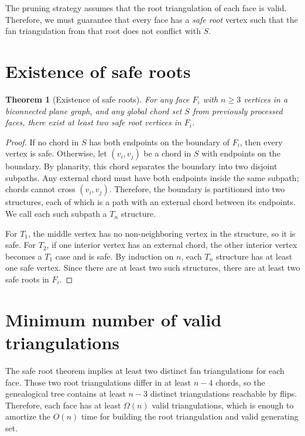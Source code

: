 \documentclass[12pt,a4paper]{report}
\newtheorem{theorem}{Theorem}[chapter]
\theoremstyle{definition}
\theoremstyle{remark}
\newcommand{\ChordSet}{S}
\begin{document}
The pruning strategy assumes that the root triangulation of each face is valid. Therefore,
we must guarantee that every face has a \textit{safe root} vertex such that the fan
triangulation from that root does not conflict with $\ChordSet$.

\section{Existence of safe roots}

\begin{theorem}[Existence of safe roots]
\label{thm:safe_root}
For any face $F_i$ with $n \ge 3$ vertices in a biconnected plane graph, and any global
chord set $\ChordSet$ from previously processed faces, there exist at least two safe root
vertices in $F_i$.
\end{theorem}

\begin{proof}
If no chord in $\ChordSet$ has both endpoints on the boundary of $F_i$, then every vertex
is safe. Otherwise, let $(v_i,v_j)$ be a chord in $\ChordSet$ with endpoints on the
boundary. By planarity, this chord separates the boundary into two disjoint subpaths.
Any external chord must have both endpoints inside the same subpath; chords cannot cross
$(v_i,v_j)$. Therefore, the boundary is partitioned into two structures, each of which is
a path with an external chord between its endpoints. We call each such subpath a $T_n$
structure.

For $T_1$, the middle vertex has no non-neighboring vertex in the structure, so it is
safe. For $T_2$, if one interior vertex has an external chord, the other interior vertex
becomes a $T_1$ case and is safe. By induction on $n$, each $T_n$ structure has at least
one safe vertex. Since there are at least two such structures, there are at least two safe
roots in $F_i$.
\end{proof}

\section{Minimum number of valid triangulations}

The safe root theorem implies at least two distinct fan triangulations for each face.
Those two root triangulations differ in at least $n-4$ chords, so the genealogical tree
contains at least $n-3$ distinct triangulations reachable by flips. Therefore, each face
has at least $\Omega(n)$ valid triangulations, which is enough to amortize the $O(n)$
time for building the root triangulation and valid generating set.
\end{document}
